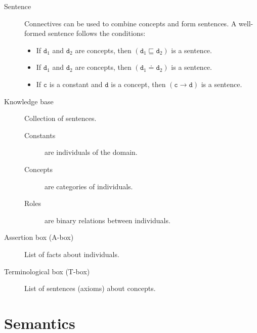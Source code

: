 \begin{description}
    \item[Sentence] 
        Connectives can be used to combine concepts and form sentences.
        A well-formed sentence follows the conditions:
        \begin{itemize}
            \item If $\texttt{d}_1$ and $\texttt{d}_2$ are concepts, 
                then $(\texttt{d}_1 \sqsubseteq \texttt{d}_2)$ is a sentence.
            \item If $\texttt{d}_1$ and $\texttt{d}_2$ are concepts, 
                then $(\texttt{d}_1 \doteq \texttt{d}_2)$ is a sentence.
            \item If $\texttt{c}$ is a constant and $\texttt{d}$ is a concept,
                then $(\texttt{c} \rightarrow \texttt{d})$ is a sentence.
        \end{itemize}

    \item[Knowledge base] 
        Collection of sentences.
        \begin{description}
            \item[Constants] are individuals of the domain.
            \item[Concepts] are categories of individuals.
            \item[Roles] are binary relations between individuals.
        \end{description}


    \item[Assertion box (A-box)] 
        List of facts about individuals.

    \item[Terminological box (T-box)] 
        List of sentences (axioms) about concepts.
\end{description}



\section{Semantics}

